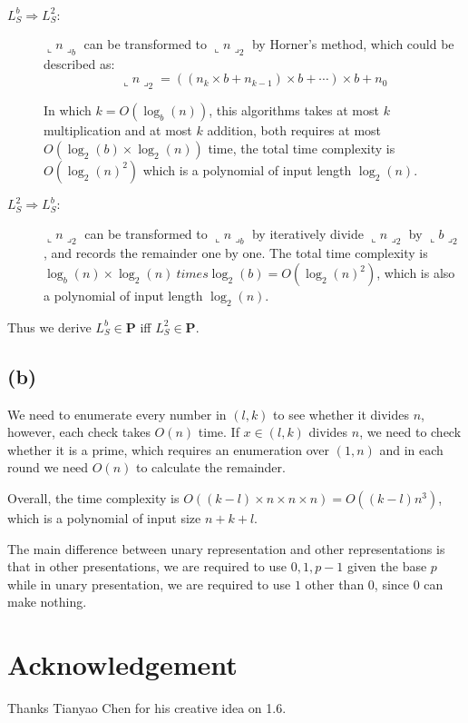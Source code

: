 \documentclass[paper=a4, fontsize=11pt]{scrartcl} %
\numberwithin{equation}{section} %
\numberwithin{figure}{section} %
\numberwithin{table}{section} %
\begin{document}
\begin{description}
\item[$L_S^b \Longrightarrow L_S^2:$]

$\llcorner n \lrcorner_b$ can be transformed to $\llcorner n \lrcorner_2$ by Horner's method, which could be described as:
$$\llcorner n \lrcorner_2 = ((n_k \times b + n_{k-1})\times b + \cdots)\times b + n_0$$

In which $k = O(\log_b(n))$, this algorithms takes at most $k$ multiplication and at most $k$ addition, both requires at most $O(\log_2(b)\times \log_2(n))$ time, the total time complexity is $O(\log_2(n)^2)$ which is a polynomial of input length $\log_2(n)$.
\item[$L_S^2 \Longrightarrow L_S^b:$]

$\llcorner n \lrcorner_2$ can be transformed to $\llcorner n \lrcorner_b$ by iteratively divide $\llcorner n \lrcorner_2$ by $\llcorner b \lrcorner_2$, and records the remainder one by one.
The total time complexity is $\log_b(n) \times \log_2(n)\ times \log_2(b) = O(\log_2(n)^2)$, which is also a polynomial of input length $\log_2(n)$.
\end{description}

Thus we derive $L_S^b\in \mathbf{P}$ iff $L_S^2\in \mathbf{P}$.
\subsection*{(b)}
We need to enumerate every number in $(l, k)$ to see whether it divides $n$, however, each check takes $O(n)$ time. If $x\in(l, k)$ divides $n$, we need to check whether it is a prime, which requires an enumeration over $(1, n)$ and in each round we need $O(n)$ to calculate the remainder.

Overall, the time complexity is $O((k - l) \times n \times n \times n) = O((k-l)n^3)$, which is a polynomial of input size $n + k + l$.

The main difference between unary representation and other representations is that in other presentations, we are required to use $0, 1, p-1$ given the base $p$ while in unary presentation, we are required to use $1$ other than $0$, since $0$ can make nothing.

\section*{Acknowledgement}
Thanks Tianyao Chen for his creative idea on 1.6.
\end{document}
